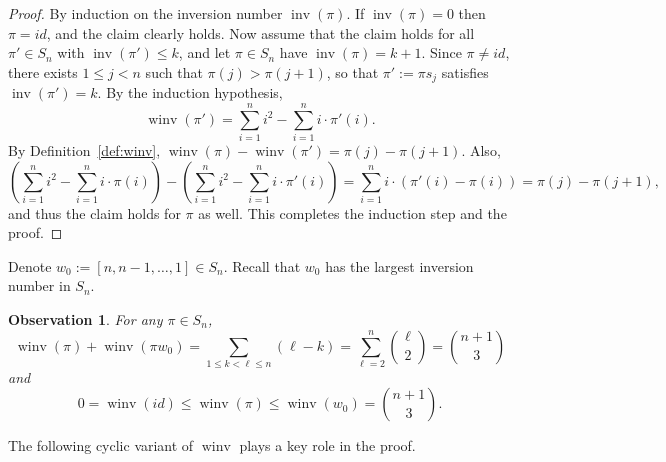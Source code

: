 \documentclass[11pt]{amsart}
\newtheorem{observation}[theorem]{Observation}
\numberwithin{equation}{section}
\newcommand{\todo}[1]{\vspace{5 mm}\par \noindent
\marginpar{\textsc{ToDo}} \framebox{\begin{minipage}[c]{0.95
\textwidth}
 #1 \end{minipage}}\vspace{5 mm}\par}
\newcommand{\inv}{{\operatorname{inv}}}
\newcommand{\winv}{{\operatorname{winv}}}
\begin{document}
\begin{proof}
    By induction on the inversion number $\inv(\pi)$. 
    If $\inv(\pi) = 0$ then $\pi = id$, and the claim clearly holds. 
    Now assume that the claim holds for all $\pi' \in S_n$ with $\inv(\pi') \le k$, and let $\pi \in S_n$ have $\inv(\pi) = k+1$. 
    Since $\pi \ne id$, there exists $1 \le j<n$ such that $\pi(j) > \pi(j+1)$, so that $\pi' := \pi s_j$ satisfies
    $\inv(\pi') = k$. 
    By the induction hypothesis,
    \[
        \winv(\pi') 
        = \sum_{i=1}^n i^2 -
        \sum_{i=1}^n i\cdot \pi'(i) .
    \]    
    By Definition~\ref{def:winv}, $\winv(\pi) - \winv(\pi') = \pi(j) - \pi(j+1)$. Also,
    \[
        \left( \sum_{i=1}^n i^2 -
        \sum_{i=1}^n i\cdot \pi(i) \right)
        - \left( \sum_{i=1}^n i^2 -
        \sum_{i=1}^n i\cdot \pi'(i) \right)
        = \sum_{i=1}^n i \cdot \left( \pi'(i) - \pi(i) \right)
        = \pi(j) - \pi(j+1),
    \]
    and thus the claim holds for $\pi$ as well.
    This completes the induction step and the proof.
\end{proof}

Denote $w_0:=[n,n-1,\dots,1]\in S_n$. Recall that $w_0$ has the largest inversion number in $S_n$. 

\begin{observation}\label{obs:u2}
    For any $\pi \in S_n$,
        \[
            \winv(\pi)+\winv(\pi w_0)
            = \sum_{1 \le k < \ell \le n} (\ell - k)
            = \sum_{\ell = 2}^{n} \binom{\ell}{2} = \binom{n+1}{3}
        \]
        and
        \[
            0 = \winv(id) 
            \le \winv(\pi)
            \le \winv(w_0)
            = \binom{n+1}{3}.
        \]
\end{observation}

The following cyclic variant of $\winv$ plays a key role in the proof.
\end{document}
